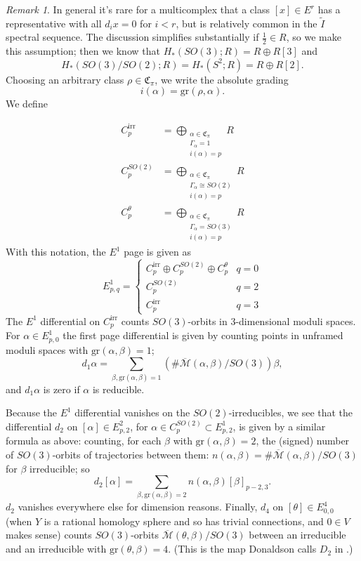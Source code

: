 \documentclass{memo-l}
\theoremstyle{definition}
\theoremstyle{remark}
\newtheorem{remark}[theorem]{Remark}
\numberwithin{section}{chapter}
\numberwithin{equation}{chapter}
\begin{document}
\begin{remark}In general it's rare for a multicomplex that a class $[x] \in E^r$ has a representative with all $d_i x = 0$ for $i < r$, but is relatively common in the $\widetilde I$ spectral sequence. The discussion simplifies substantially if $\frac 12 \in R$, so we make this assumption; then we know that $H_*(SO(3);R) = R \oplus R[3]$ and $$H_*(SO(3)/SO(2);R) = H_*(S^2;R) = R \oplus R[2].$$
\noindent
Choosing an arbitrary class $\rho \in \mathfrak C_\pi$, we write the absolute grading $$i(\alpha) = \text{gr}(\rho, \alpha).$$ We define

\begin{align*}C^{\text{irr}}_p &= \bigoplus_{\substack{\alpha \in \mathfrak C_\pi\\ \Gamma_\alpha = 1 \\ i(\alpha) =p}} R\\ C^{SO(2)}_p &= \bigoplus_{\substack{\alpha \in \mathfrak C_\pi\\ \Gamma_\alpha \cong SO(2) \\ i(\alpha) =p}} R \\ C^{\theta}_p &= \bigoplus_{\substack{\alpha \in \mathfrak C_\pi\\ \Gamma_\alpha = SO(3) \\ i(\alpha) =p}} R\end{align*}
\noindent
With this notation, the $E^1$ page is given as
\[ E^1_{p,q} = \begin{cases}
      C^{\text{irr}}_{p} \oplus C^{SO(2)}_p \oplus C^\theta_p & q = 0 \\
      C^{SO(2)}_p & q=2 \\
      C^{\text{irr}}_p & q=3
   \end{cases}
\]
The $E^1$ differential on $C^{\text{irr}}_p$ counts $SO(3)$-orbits in 3-dimensional moduli spaces. For $\alpha \in E^1_{p,0}$ the first page differential is given by counting points in unframed moduli spaces with $\text{gr}(\alpha, \beta) = 1$; $$d_1\alpha = \sum_{\beta, \text{gr}(\alpha, \beta) = 1} \left(\# \overline{\mathcal M}(\alpha, \beta)/SO(3)\right) \beta,$$ and $d_1 \alpha$ is zero if $\alpha$ is reducible.

Because the $E^1$ differential vanishes on the $SO(2)$-irreducibles, we see that the differential $d_2$ on $[\alpha] \in E^2_{p,2}$, for $\alpha \in C^{SO(2)}_p \subset E^1_{p,2}$, is given by a similar formula as above: counting, for each $\beta$ with $\text{gr}(\alpha, \beta) = 2$, the (signed) number of $SO(3)$-orbits of trajectories between them: $n(\alpha, \beta) = \# \overline{\mathcal M}(\alpha, \beta)/SO(3)$ for $\beta$ irreducible; so $$d_2[\alpha] = \sum_{\beta, \text{gr}(\alpha, \beta) = 2} n(\alpha, \beta) [\beta]_{p-2,3}.$$ $d_2$ vanishes everywhere else for dimension reasons. Finally, $d_4$ on $[\theta] \in E^4_{0,0}$ (when $Y$ is a rational homology sphere and so has trivial connections, and $0 \in V$ makes sense) counts $SO(3)$-orbits $\overline{\mathcal M}(\theta, \beta)/SO(3)$ between an irreducible and an irreducible with $\text{gr}(\theta, \beta) = 4$. (This is the map Donaldson calls $D_2$ in \cite[Section~7.1]{Don}.)
\end{remark}
\end{document}
